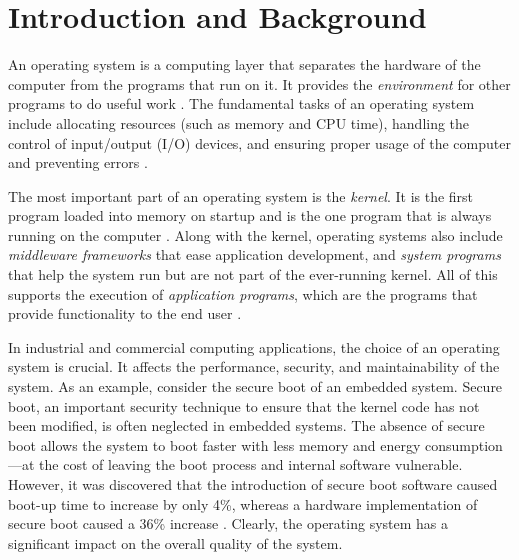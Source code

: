 \section*{Introduction and Background}
    An operating system is a computing layer that separates the hardware of the
        computer from the programs that run on it.
    It provides the \textit{environment} for other programs to do useful work
        \cite[p. 4]{textbook}.
    The fundamental tasks of an operating system include allocating resources
        (such as memory and CPU time), handling the control of input/output
        (I/O) devices, and ensuring proper usage of the computer and preventing
        errors \cite[pp. 3-5]{textbook}.

    The most important part of an operating system is the \textit{kernel}. It is
        the first program loaded into memory on startup and is the one program
        that is always running on the computer \cite[pp. 6-7, 22]{textbook}.
    Along with the kernel, operating systems also include
        \textit{middleware frameworks} that ease application development, and
        \textit{system programs} that help the system run but are not part of
        the ever-running kernel.
    All of this supports the execution of \textit{application programs}, which
        are the programs that provide functionality to the end user
        \cite[p. 4, 7]{textbook}.

    In industrial and commercial computing applications, the choice of an
        operating system is crucial.
    It affects the performance, security, and maintainability of the system.
    As an example, consider the secure boot of an embedded system.
    Secure boot, an important security technique to ensure that the kernel code
        has not been modified, is often neglected in embedded systems.
    The absence of secure boot allows the system to boot faster with less memory
        and energy consumption---at the cost of leaving the boot process and
        internal software vulnerable.
    However, it was discovered that the introduction of secure boot software
        caused boot-up time to increase by only 4\%, whereas a hardware
        implementation of secure boot caused a 36\% increase
        \cite[pp. 11-12]{ingelhag}.
    Clearly, the operating system has a significant impact on the overall
        quality of the system.


